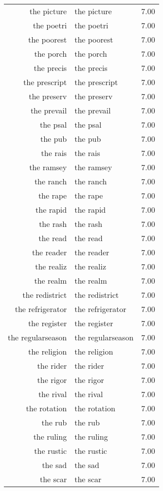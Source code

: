 \begin{table}[ht]
\begin{tabular}{rlr}
  the picture & the picture & 7.00 \\ 
  the poetri & the poetri & 7.00 \\ 
  the poorest & the poorest & 7.00 \\ 
  the porch & the porch & 7.00 \\ 
  the precis & the precis & 7.00 \\ 
  the prescript & the prescript & 7.00 \\ 
  the preserv & the preserv & 7.00 \\ 
  the prevail & the prevail & 7.00 \\ 
  the psal & the psal & 7.00 \\ 
  the pub & the pub & 7.00 \\ 
  the rais & the rais & 7.00 \\ 
  the ramsey & the ramsey & 7.00 \\ 
  the ranch & the ranch & 7.00 \\ 
  the rape & the rape & 7.00 \\ 
  the rapid & the rapid & 7.00 \\ 
  the rash & the rash & 7.00 \\ 
  the read & the read & 7.00 \\ 
  the reader & the reader & 7.00 \\ 
  the realiz & the realiz & 7.00 \\ 
  the realm & the realm & 7.00 \\ 
  the redistrict & the redistrict & 7.00 \\ 
  the refrigerator & the refrigerator & 7.00 \\ 
  the register & the register & 7.00 \\ 
  the regularseason & the regularseason & 7.00 \\ 
  the religion & the religion & 7.00 \\ 
  the rider & the rider & 7.00 \\ 
  the rigor & the rigor & 7.00 \\ 
  the rival & the rival & 7.00 \\ 
  the rotation & the rotation & 7.00 \\ 
  the rub & the rub & 7.00 \\ 
  the ruling & the ruling & 7.00 \\ 
  the rustic & the rustic & 7.00 \\ 
  the sad & the sad & 7.00 \\ 
  the scar & the scar & 7.00 \\ 

\end{tabular}
\end{table}
